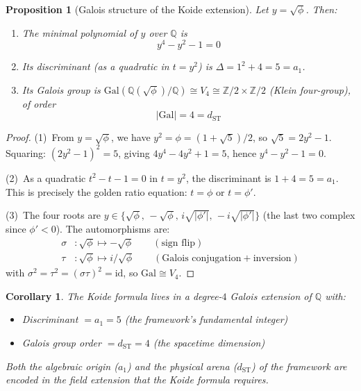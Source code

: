 \documentclass[12pt,a4paper]{article}
\newtheorem{proposition}{Proposition}
\newtheorem{corollary}{Corollary}
\theoremstyle{definition}
\begin{document}
\begin{proposition}[Galois structure of the Koide extension]
\label{prop:galois}
Let $y = \sqrt{\phi}$.  Then:
\begin{enumerate}
\item The minimal polynomial of $y$ over $\mathbb{Q}$ is
\begin{equation}
y^4 - y^2 - 1 = 0
\label{eq:min_poly}
\end{equation}
\item Its discriminant (as a quadratic in $t = y^2$) is $\Delta = 1^2 + 4 = 5 = a_1$.
\item Its Galois group is $\mathrm{Gal}(\mathbb{Q}(\sqrt{\phi})/\mathbb{Q}) \cong V_4 \cong \mathbb{Z}/2 \times \mathbb{Z}/2$ (Klein four-group), of order
\begin{equation}
|\mathrm{Gal}| = 4 = d_{\mathrm{ST}}
\end{equation}
\end{enumerate}
\end{proposition}

\begin{proof}
(1)~From $y = \sqrt{\phi}$, we have $y^2 = \phi = (1+\sqrt{5})/2$, so $\sqrt{5} = 2y^2 - 1$.  Squaring: $(2y^2 - 1)^2 = 5$, giving $4y^4 - 4y^2 + 1 = 5$, hence $y^4 - y^2 - 1 = 0$.

(2)~As a quadratic $t^2 - t - 1 = 0$ in $t = y^2$, the discriminant is $1 + 4 = 5 = a_1$.  This is precisely the golden ratio equation: $t = \phi$ or $t = \phi'$.

(3)~The four roots are $y \in \{\sqrt{\phi},\, -\sqrt{\phi},\, i\sqrt{|\phi'|},\, -i\sqrt{|\phi'|}\}$ (the last two complex since $\phi' < 0$).  The automorphisms are:
\begin{align}
\sigma &: \sqrt{\phi} \mapsto -\sqrt{\phi} \qquad (\text{sign flip}) \\
\tau &: \sqrt{\phi} \mapsto i/\sqrt{\phi} \qquad (\text{Galois conjugation} + \text{inversion})
\end{align}
with $\sigma^2 = \tau^2 = (\sigma\tau)^2 = \mathrm{id}$, so $\mathrm{Gal} \cong V_4$.
\end{proof}

\begin{corollary}
The Koide formula lives in a degree-$4$ Galois extension of $\mathbb{Q}$ with:
\begin{itemize}
\item Discriminant $= a_1 = 5$ (the framework's fundamental integer)
\item Galois group order $= d_{\mathrm{ST}} = 4$ (the spacetime dimension)
\end{itemize}
Both the algebraic origin ($a_1$) and the physical arena ($d_{\mathrm{ST}}$) of the framework are encoded in the field extension that the Koide formula requires.
\end{corollary}
\end{document}
